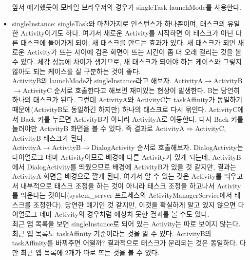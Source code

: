\begin{itemize}
앞서 얘기했듯이 모바일 브라우저의 경우가 singleTask launchMode를 사용한다. 

\item singleInstance: singleTask와 마찬가지로 인스턴스가 하나뿐이며, 태스크의 유일한 Activity이기도 하다. 여기서 새로운 Activity를 시작하면 이 태스크가 아닌 다른 태스크에 들어가게 되어, 새 태스크를 만드는 효과가 있다. 새 태스크가 되면 새로운 Activity가 뜨는 사이에 검은 화면이 뜨는 시간이 좀 더 오래 걸리는 것을 볼 수 있다. 체감 성능에 차이가 생기므로, 새 태스크가 되어야 하는 케이스와 그렇지 않아도 되는 케이스를 잘 구분하는 것이 좋다.\\

ActivityB의 launchMode가 singleInstance라고 해보자. ActivityA$\rightarrow$ActivityB$\rightarrow$ActivityC 순서로 호출한다고 해보면 재미있는 현상이 발생한다. B는 당연히 하나의 태스크가 된다. 그런데 ActivityA와 ActivityC는 taskAffinity가 동일하기 때문에(ActivityB도 동일하긴 하지만) 하나의 태스크로 다시 묶인다. ActivityC에서 Back 키를 누르면 ActivityB가 아니라 ActivityA로 이동한다. 다시 Back 키를 눌러야만 ActivityB 화면을 볼 수 있다. 즉 결과로 ActivityA$\Rightarrow$ActivityC, ActivityB 태스크가 된다.\\

ActivityA$\rightarrow$ActivityB$\rightarrow$DialogActivity 순서로 호출해보자. 
DialogActivity는 다이얼로그 테마 Activity이므로 배경에 다른 Activity가 있게 되는데, ActivityB에서 DialogActivity를 띄웠으므로 배경에 ActivityB가 있을 것 같지만, 결과는 ActivityA 화면을 배경으로 깔게 된다.
여기서 알 수 있는 것은 Activity를 띄우고서 내부적으로 태스크 조정을 하는 것이 아니라 태스크 조정을 하고나서 Activity를 띄운다는 것이다(system\_server 프로세스의 ActivityManagerService에서 태스크를 조정한다). 당연한 얘기인 것 같지만, 이것을 확실하게 알고 있지 않으면 다이얼로그 테마 Activity의 경우처럼 예상치 못한 결과를 볼 수도 있다.\\

최근 앱 목록을 보면 singleInstance로 되어 있는 Activity는 따로 보이지 않는다. 최근 앱 목록도 taskAffinity 기준이라는 것을 알 수 있다.
ActivityB의 taskAffinity를 바꿔주면 어떨까? 결과적으로 태스크가 분리되는 것은 동일하다. 다만 최근 앱 목록에 2개가 따로 뜨는 것을 볼 수 있다.
\end{itemize}
